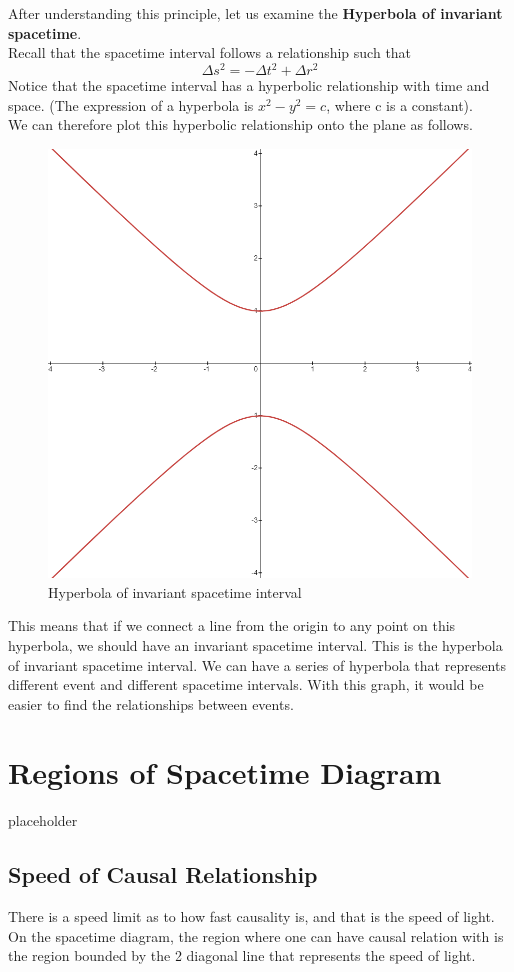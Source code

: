 \documentclass[12pt]{book}
\begin{document}
\newline
After understanding this principle, let us examine the \textbf{Hyperbola of invariant spacetime}.\\
\newline
Recall that the spacetime interval follows a relationship such that
\[
\Delta s^2 = - \Delta t^2 + \Delta r^2
\]
Notice that the spacetime interval has a hyperbolic relationship with time and space. (The expression of a hyperbola is \( x^2 - y^2 = c\), where c is a constant).
\\
\newpage
We can therefore plot this hyperbolic relationship onto the plane as follows. 
\begin{figure}[!h]
    \centering
    \includegraphics[width=0.5\linewidth]{picture/hyperbola=1.png}
    \caption{Hyperbola of invariant spacetime interval}
    \label{fig:hyperbolic spacetime}
\end{figure}
This means that if we connect a line from the origin to any point on this hyperbola, we should have an invariant spacetime interval. This is the hyperbola of invariant spacetime interval. We can have a series of hyperbola that represents different event and different spacetime intervals. With this graph, it would be easier to find the relationships between events. 


\section{Regions of Spacetime Diagram}
placeholder

\subsection{Speed of Causal Relationship}
There is a speed limit as to how fast causality is, and that is the speed of light. On the spacetime diagram, the region where one can have causal relation with is the region bounded by the 2 diagonal line that represents the speed of light. 
\end{document}
